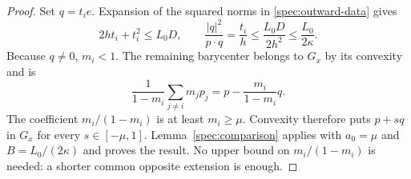 \begin{proof}
Set $q=t_ie$.  Expansion of the squared norms in
\eqref{spec:outward-data} gives
\[
  2ht_i+t_i^2\le L_0D,
  \qquad
  \frac{|q|^2}{p\cdot q}=\frac{t_i}{h}
          \le\frac{L_0D}{2h^2}\le\frac{L_0}{2\kappa}.
\]
Because $q\ne0$, $m_i<1$.  The remaining barycenter belongs to
$G_x$ by its convexity and is
\[
  \frac1{1-m_i}\sum_{j\ne i}m_jp_j
       =p-\frac{m_i}{1-m_i}q.
\]
The coefficient $m_i/(1-m_i)$ is at least $m_i\ge\mu$.
Convexity therefore puts $p+s q$ in $G_x$ for every
$s\in[-\mu,1]$.  Lemma~\ref{spec:comparison} applies with
$a_0=\mu$ and $B=L_0/(2\kappa)$ and proves the result.
No upper bound on $m_i/(1-m_i)$ is needed: a shorter common
opposite extension is enough.
\end{proof}
